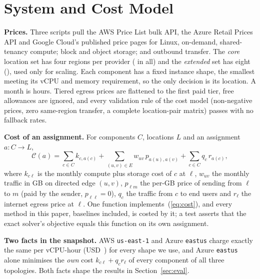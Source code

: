 \documentclass[conference]{IEEEtran}
\begin{document}
\section{System and Cost Model}
\label{sec:model}
\textbf{Prices.} Three scripts pull the AWS Price List bulk API, the Azure Retail Prices API and
Google Cloud's published price pages for Linux, on-demand, shared-tenancy compute; block and object
storage; and outbound transfer. The \emph{core} location set has four regions per provider
( in all) and the \emph{extended} set has eight (), used only for scaling.
Each component has a fixed instance shape, the smallest meeting its vCPU and memory requirement,
so the only decision is its location. A month is  hours. Tiered egress prices are
flattened to the first paid tier, free allowances are ignored, and every validation rule of the
cost model (non-negative prices, zero same-region transfer, a complete location-pair matrix)
passes with no fallback rates.

\textbf{Cost of an assignment.} For components $C$, locations $L$ and an assignment $a: C\to L$,
\begin{equation}
\mathcal{C}(a)=\sum_{c\in C} k_{c,a(c)}+\sum_{(u,v)\in E} w_{uv}\,p_{a(u),a(v)}+\sum_{c\in C} q_c\,r_{a(c)},
\label{eq:cost}
\end{equation}
where $k_{c\ell}$ is the monthly compute plus storage cost of $c$ at $\ell$, $w_{uv}$ the monthly
traffic in GB on directed edge $(u,v)$, $p_{\ell m}$ the per-GB price of sending from $\ell$ to
$m$ (paid by the sender, $p_{\ell\ell}=0$), $q_c$ the traffic from $c$ to end users and $r_\ell$
the internet egress price at $\ell$. One function implements~(\ref{eq:cost}), and every method in
this paper, baselines included, is costed by it; a test asserts that the exact solver's objective
equals this function on its own assignment.

\textbf{Two facts in the snapshot.} AWS \texttt{us-east-1} and Azure \texttt{eastus} charge exactly
the same per vCPU-hour (USD~) for every shape we use, and Azure \texttt{eastus} alone
minimises the \emph{own} cost $k_{c\ell}+q_c r_\ell$ of every component of all three topologies.
Both facts shape the results in Section~\ref{sec:eval}.
\end{document}
